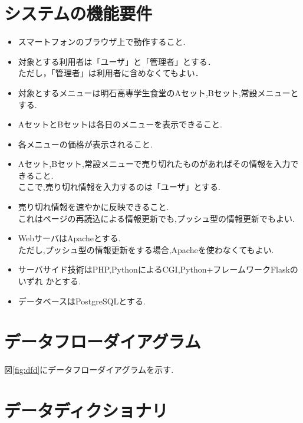 \documentclass[dvipdfmx, 11pt]{jsarticle}
\begin{document}
\section{システムの機能要件}
    \begin{itemize}
        \item スマートフォンのブラウザ上で動作すること.
        \item 対象とする利用者は「ユーザ」と「管理者」とする． \\
            ただし，「管理者」は利用者に含めなくてもよい．
        \item 対象とするメニューは明石高専学生食堂のAセット,Bセット,常設メニューとする.
        \item AセットとBセットは各日のメニューを表示できること.
        \item 各メニューの価格が表示されること.
        \item Aセット,Bセット,常設メニューで売り切れたものがあればその情報を入力できること. \\
            ここで,売り切れ情報を入力するのは「ユーザ」とする.
        \item 売り切れ情報を速やかに反映できること. \\
            これはページの再読込による情報更新でも,プッシュ型の情報更新でもよい.
        \item WebサーバはApacheとする. \\
            ただし,プッシュ型の情報更新をする場合,Apacheを使わなくてもよい.
        \item サーバサイド技術はPHP,PythonによるCGI,Python+フレームワークFlaskのいずれ
        かとする.
        \item データベースはPostgreSQLとする.
    \end{itemize}

\section{データフローダイアグラム}
    図\ref{fig:dfd}にデータフローダイアグラムを示す.

\section{データディクショナリ}
\end{document}
